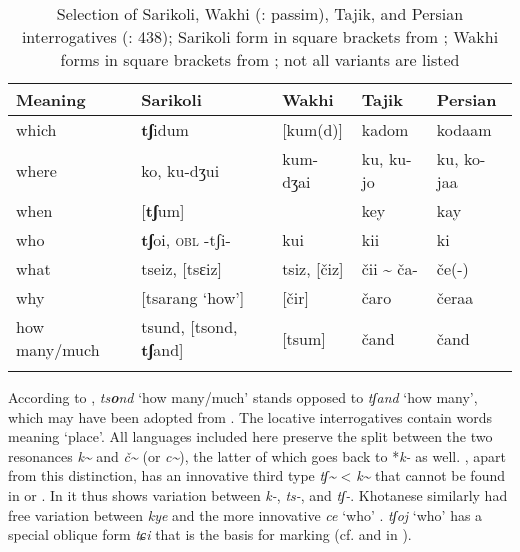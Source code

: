 \begin{table}
\caption{Selection of Sarikoli, Wakhi (\citealt{GaoErqiang1985}: passim), Tajik, and Persian interrogatives (\citealt{WindfuhrPerry2009}: 438); Sarikoli form in square brackets from \cite[88, 120, 162f.]{Xiren2015}; Wakhi forms in square brackets from \citet[831]{Bashir2009}; not all variants are listed}
\label{tab:indo:18}

\begin{tabularx}{\textwidth}{Xllll}
\lsptoprule

\textbf{Meaning} & \textbf{Sarikoli} & \textbf{Wakhi} & \textbf{Tajik} & \textbf{Persian}\footnotemark\\
\midrule
which & \textbf{tʃ}idum & [kum(d)] & kadom & kodaam\\
where & ko, ku-dʒui & kum-dʒai & ku, ku-jo & ku, ko-jaa\\
when & [\textbf{tʃ}um] &  & key & kay\\
who & \textbf{tʃ}oi, \textsc{obl} -tʃi- & kui & kii & ki\\
what & tseiz, [tsɛiz] & tsiz, [čiz] & čii {\textasciitilde} ča- & če(-)\\
why & [tsarang ‘how’] & [čir] & čaro & čeraa\\
how many/much & tsund, [tsond, \textbf{tʃ}and] & [tsum] & čand & čand\\
\lspbottomrule
\end{tabularx}
\end{table}


According to \citet[163]{Xiren2015},  \textit{ts}\textbf{\textit{o}}\textit{nd} ‘how many/much’ stands opposed to \textit{tʃand} ‘how many’, which may have been adopted from . The locative interrogatives contain words meaning ‘place’. All  languages included here preserve the split between the two resonances \textit{k{\textasciitilde}} and \textit{č{\textasciitilde}} (or \textit{c{\textasciitilde}}), the latter of which goes back to *\textit{k-} as well. , apart from this distinction, has an innovative third type \textit{tʃ{\textasciitilde}} < \textit{k{\textasciitilde}} that cannot be found in  or . In \citet{GaoErqiang1985} it thus shows  variation between \textit{k-}, \textit{ts-}, and \textit{tʃ-}. Khotanese similarly had free variation between \textit{kye} and the more innovative \textit{ce} ‘who’ \citep[387]{Emmerick2009}.  \textit{tʃoj} ‘who’ has a special oblique form \textit{tɕi} that is the basis for  marking (cf.  and  in ).

